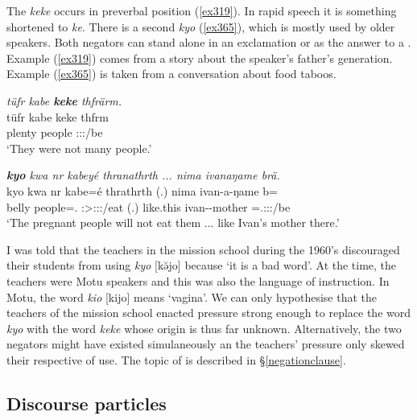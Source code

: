 The  \emph{keke} occurs in preverbal position (\ref{ex319}). In rapid speech it is something shortened to \emph{ke}. There is a second  \emph{kyo} (\ref{ex365}), which is mostly used by older speakers. Both negators can stand alone in an exclamation or as the answer to a . Example (\ref{ex319}) comes from a story about the speaker's father's generation. Example (\ref{ex365}) is taken from a conversation about food taboos.

\begin{exe}
	\ex \emph{tüfr kabe \textbf{keke} thfrärm.}\\
	\gll tüfr kabe keke thfrm\\
	plenty people \Neg{} \Stpl:\Sbj:\Pst:\Dur/be\\
	\trans `They were not many people.' 
	\label{ex319}
\end{exe}
\begin{exe}
	\ex \emph{\textbf{kyo} kwa nr kabeyé thranathrth ... nima ivanaŋame brä.}\\
	\gll kyo kwa nr kabe=é thrathrth (.) nima ivan-a-ŋame b=\\
	\Neg{} \Fut{} belly people=\Erg.\Nsg{} \Stpl:\Sbj>\Stpl:\Obj:\Irr:\Ipfv/eat (.) like.this ivan-\Poss-mother \Med=\Tsg.\F:\Sbj:\Nonpast:\Ipfv/be\\
	\trans `The pregnant people will not eat them ... like Ivan's mother there.'\\ 
	\label{ex365}
\end{exe}

I was told that the teachers in the mission school during the 1960's discouraged their students from using \emph{kyo} [kə̆jo] because `it is a bad word'. At the time, the teachers were Motu speakers and this was also the language of instruction. In Motu, the word \emph{kio} [kijo] means `vagina'. We can only hypothesise that the teachers of the mission school enacted pressure strong enough to replace the word \emph{kyo} with the word \emph{keke} whose origin is thus far unknown. Alternatively, the two negators might have existed simulaneously an the teachers' pressure only skewed their respective  of use. The topic of  is described in \S\ref{negationclause}.

\subsection{Discourse particles} \label{discourse-particles}

